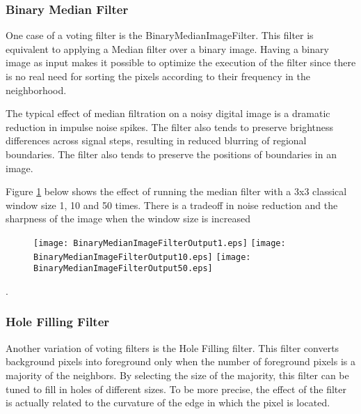 \subsubsection{Binary Median Filter}

One case of a voting filter is the BinaryMedianImageFilter.
This filter is equivalent to applying a Median filter over a binary image.
Having a binary image as input makes it possible to optimize the execution
of the filter since there is no real need for sorting the pixels according to
their frequency in the neighborhood.



The typical effect of median filtration on a noisy digital image is a dramatic reduction in impulse noise spikes. The filter also tends to preserve brightness differences across signal steps, resulting in reduced blurring of regional boundaries. The filter also tends to preserve the positions of boundaries in an image.

Figure \ref{fig:BinaryMedianImageFilterOutputMultipleIterations} below shows the effect of running the median filter with a 3x3 classical window size
1, 10 and 50 times. There is a tradeoff in noise reduction and the sharpness of the image when the window size is increased\begin{figure}
  \center
  \texttt{[image: BinaryMedianImageFilterOutput1.eps]}
  \texttt{[image: BinaryMedianImageFilterOutput10.eps]}
  \texttt{[image: BinaryMedianImageFilterOutput50.eps]}
  \label{fig:BinaryMedianImageFilterOutputMultipleIterations}
\end{figure}.


\subsubsection{Hole Filling Filter}

Another variation of voting filters is the Hole Filling filter. This filter
converts background pixels into foreground only when the number of foreground
pixels is a majority of the neighbors. By selecting the size of the majority,
this filter can be tuned to fill in holes of different sizes. To be more
precise, the effect of the filter is actually related to the curvature of the
edge in which the pixel is located.

